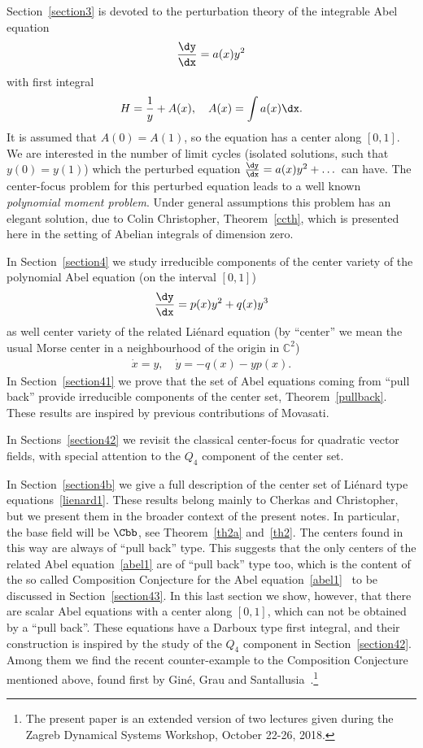 Section~\ref{section3} is devoted to the perturbation theory of the integrable Abel equation
\[
\frac{\dy}{\dx} = a(x) y^2
\]
with first integral
\[
H= \frac1y + A(x),\quad A(x)= \int a(x) \dx.
\]
It is assumed that $A(0)=A(1)$, so the equation has a center along $[0,1]$. We are interested in the number of limit cycles (isolated solutions, such that $y(0)=y(1)$) which the perturbed equation $
\frac{\dy}{\dx} = a(x) y^2 + \dots $ can have. The center-focus problem for this perturbed equation leads to a well known \emph{ polynomial moment problem}. Under general assumptions this problem has an elegant solution, due to Colin Christopher, Theorem~\ref{ccth}, which is presented here in the setting of Abelian integrals of dimension zero.

In Section~\ref{section4} we study irreducible components of the center variety of the polynomial Abel equation (on the interval $[0,1]$)
\begin{align}\label{abel1}
\frac{\dy}{\dx} = p(x) y^2 + q(x) y^3
\end{align}
as well center variety of the related Liénard equation (by ``center'' we mean the usual Morse center in a neighbourhood of the origin in $\mathbb C^2$)
\begin{align}\label{lienard1}
\dot{x} = y, \quad \dot{y} = -q(x) - y p(x).
\end{align}
In Section~\ref{section41} we prove that the set of Abel equations coming from ``pull back'' provide irreducible components of the center set, Theorem~\ref{pullback}. These results are inspired by previous contributions of Movasati.

In Sections~\ref{section42} we revisit the classical center-focus for quadratic vector fields, with special attention to the $Q_4$ component of the center set.

In Section~\ref{section4b} we give a full description of the center set of Liénard type equations~\eqref{lienard1}. These results belong mainly to Cherkas and Christopher, but we present them in the broader context of the present notes. In particular, the base field will be $\Cbb$, see Theorem~\ref{th2a} and~\ref{th2}. The centers found in this way are always of ``pull back'' type. This suggests that the only centers of the related Abel equation~\eqref{abel1} are of ``pull back'' type too, which is the content of the so called Composition Conjecture for the Abel equation~\eqref{abel1}~\cite[p.~444]{bry10} to be discussed in Section~\ref{section43}. In this last section we show, however, that there are scalar Abel equations with a center along $[0,1]$, which can not be obtained by a ``pull back''. These equations have a Darboux type first integral, and their construction is inspired by the study of the $Q_4$ component in Section~\ref{section42}. Among them we find the recent counter-example to the Composition Conjecture mentioned above, found first by Giné, Grau and Santallusia~\cite{ggs18}.\footnote{\label{myfootnote}
The present paper is an extended version of two lectures given during the Zagreb Dynamical Systems Workshop, October 22-26, 2018.}%

